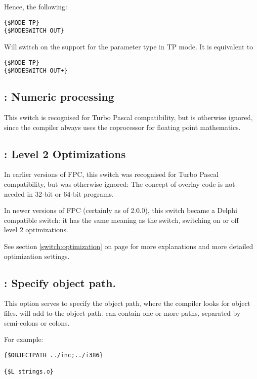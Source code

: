 Hence, the following:
\begin{verbatim}
{$MODE TP}
{$MODESWITCH OUT}
\end{verbatim}
Will switch on the support for the  parameter type in TP mode. It
is equivalent to
\begin{verbatim}
{$MODE TP}
{$MODESWITCH OUT+}
\end{verbatim}

\subsection{ : Numeric processing }

This switch is recognised for Turbo Pascal compatibility, but is otherwise
ignored, since the compiler always uses the coprocessor for floating point
mathematics.

\subsection{ : Level 2 Optimizations }

In earlier versions of FPC, this switch was recognised for Turbo Pascal 
compatibility, but was otherwise ignored: The concept of overlay code 
is not needed in 32-bit or 64-bit programs.

In newer versions of FPC (certainly as of 2.0.0), this switch became a
Delphi compatible switch: it has the same meaning as the
 switch, switching on or off level 2 optimizations.

See section \ref{switch:optimization} on page \pageref{switch:optimization}
for more explanations and more detailed optimization settings.

\subsection{ : Specify object path.}

This option serves to specify the object path, where the compiler looks for
object files.  will add  to the object
path.  can contain one or more paths, separated by semi-colons or
colons.

For example:
\begin{verbatim}
{$OBJECTPATH ../inc;../i386}

{$L strings.o}
\end{verbatim}

